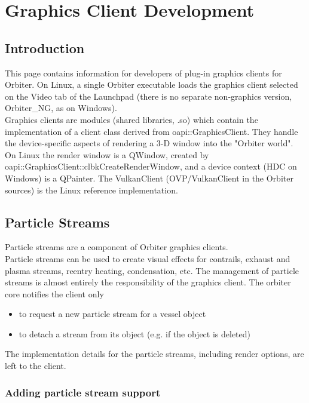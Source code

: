 \documentclass[Orbiter Developer Manual.tex]{subfiles}
\begin{document}
\section{Graphics Client Development}

\subsection{Introduction}
This page contains information for developers of plug-in graphics clients for Orbiter. On Linux, a single Orbiter executable loads the graphics client selected on the Video tab of the Launchpad (there is no separate non-graphics version, Orbiter\_NG, as on Windows).\\
Graphics clients are modules (shared libraries, .so) which contain the implementation of a client class derived from oapi::GraphicsClient. They handle the device-specific aspects of rendering a 3-D window into the "Orbiter world". On Linux the render window is a QWindow, created by oapi::\-GraphicsClient::\-clbkCreateRenderWindow, and a device context (HDC on Windows) is a QPainter. The VulkanClient (OVP/VulkanClient in the Orbiter sources) is the Linux reference implementation.


\subsection{Particle Streams}
Particle streams are a component of Orbiter graphics clients.\\
Particle streams can be used to create visual effects for contrails, exhaust and plasma streams, reentry heating, condensation, etc. The management of particle streams is almost entirely the responsibility of the graphics client. The orbiter core notifies the client only
\begin{itemize}
\item to request a new particle stream for a vessel object
\item to detach a stream from its object (e.g. if the object is deleted)
\end{itemize}

\noindent
The implementation details for the particle streams, including render options, are left to the client.


\subsubsection{Adding particle stream support}
\end{document}
